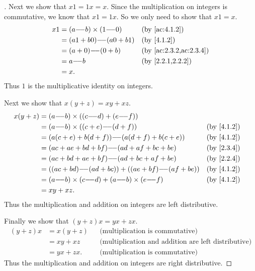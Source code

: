 \begin{proof}[]
  Next we show that \(x1 = 1x = x\).
  Since the multiplication on integers is commutative, we know that \(x1 = 1x\).
  So we only need to show that \(x1 = x\).
  \begin{align*}
    x1 & = (a \mm b) \times (1 \mm 0) &  & \by{ac:4.1.2}          \\
       & = (a1 + b0) \mm (a0 + b1)    &  & \by{4.1.2}             \\
       & = (a + 0) \mm (0 + b)        &  & \by{ac:2.3.2,ac:2.3.4} \\
       & = a \mm b                    &  & \by{2.2.1,2.2.2}       \\
       & = x.
  \end{align*}
  Thus \(1\) is the multiplicative identity on integers.

  Next we show that \(x(y + z) = xy + xz\).
  \begin{align*}
    x(y + z) & = (a \mm b) \times ((c \mm d) + (e \mm f))                                \\
             & = (a \mm b) \times ((c + e) \mm (d + f))                  &  & \by{4.1.2} \\
             & = (a(c + e) + b(d + f)) \mm (a(d + f) + b(c + e))         &  & \by{4.1.2} \\
             & = (ac + ae + bd + bf) \mm (ad + af + bc + be)             &  & \by{2.3.4} \\
             & = (ac + bd + ae + bf) \mm (ad + bc + af + be)             &  & \by{2.2.4} \\
             & = ((ac + bd) \mm (ad + bc)) + ((ae + bf) \mm (af + be))   &  & \by{4.1.2} \\
             & = (a \mm b) \times (c \mm d) + (a \mm b) \times (e \mm f) &  & \by{4.1.2} \\
             & = xy + xz.
  \end{align*}
  Thus the multiplication and addition on integers are left distributive.

  Finally we show that \((y + z)x = yx + zx\).
  \begin{align*}
    (y + z)x & = x(y + z) &  & \text{(multiplication is commutative)}                     \\
             & = xy + xz  &  & \text{(multiplication and addition are left distributive)} \\
             & = yx + zx. &  & \text{(multiplication is commutative)}
  \end{align*}
  Thus the multiplication and addition on integers are right distributive.
\end{proof}

